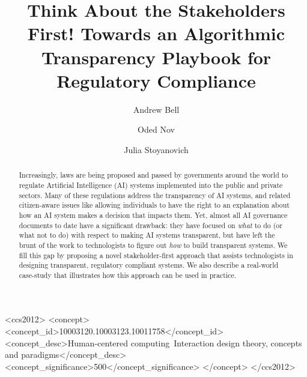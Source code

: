 \documentclass[sigconf, nonacm]{acmart}
\begin{document}
\title{Think About the Stakeholders First! Towards an Algorithmic Transparency Playbook for Regulatory Compliance}
\author{Andrew Bell}

\author{Oded Nov}

\author{Julia Stoyanovich}
\begin{abstract}

Increasingly, laws are being proposed and passed by governments around the world to regulate Artificial Intelligence (AI) systems implemented into the public and private sectors. Many of these regulations address the transparency of AI systems, and related citizen-aware issues like allowing individuals to have the right to an explanation about how an AI system makes a decision that impacts them. Yet, almost all AI governance documents to date have a significant drawback: they have focused on \emph{what} to do (or what not to do) with respect to making AI systems transparent, but have left the brunt of the work to technologists to figure out \emph{how} to build transparent systems. We fill this gap by proposing a novel stakeholder-first approach that assists technologists in designing transparent, regulatory compliant systems. We also describe a real-world case-study that illustrates how this approach can be used in practice.

\end{abstract}
\begin{CCSXML}
<ccs2012>
 <concept>
 <concept_id>10003120.10003123.10011758</concept_id>
 <concept_desc>Human-centered computing~Interaction design theory, concepts and paradigms</concept_desc>
 <concept_significance>500</concept_significance>
 </concept>
 </ccs2012>
\end{CCSXML}

\maketitle
\end{document}
